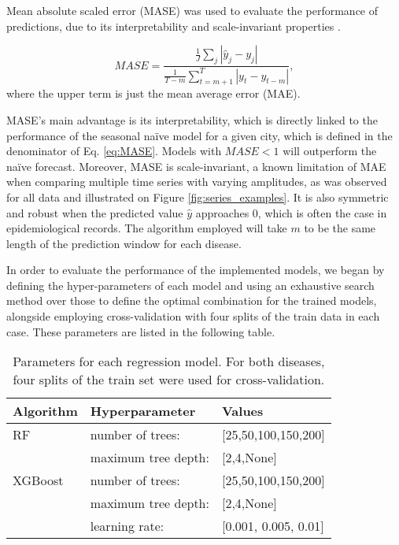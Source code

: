 Mean absolute scaled error (MASE) was used to evaluate the performance of predictions, due to its interpretability and scale-invariant properties \cite{Metricas_paper}.

	\begin{equation}
		\label{eq:MASE}
		MASE =  \frac{ \frac{1}{J} \sum_j |\hat{y}_j - y_j|}{ \frac{1}{T-m} \sum_{t=m+1} ^T |y_t - y_{t-m}|},
	\end{equation}
    \noindent
    where the upper term is just the mean average error (MAE).
    
MASE's main advantage is its interpretability, which is directly linked to the performance of the seasonal naïve model for a given city, which is defined in the denominator of Eq. \ref{eq:MASE}. Models with $MASE < 1$ will outperform the naïve forecast. Moreover, MASE is scale-invariant, a known limitation of MAE when comparing multiple time series with varying amplitudes, as was observed for all data and illustrated on Figure \ref{fig:series_examples}. It is also symmetric and robust when the predicted value $\hat{y}$ approaches 0, which is often the case in epidemiological records. The algorithm employed will take $m$ to be the same length of the prediction window for each disease.


In order to evaluate the performance of the implemented models, we began by defining the hyper-parameters of each model and using an exhaustive search method over those to define the optimal combination for the trained models, alongside employing cross-validation with four splits of the train data in each case. These parameters are listed in the following table.

\begin{table}[h]
	\caption{\label{tab:table2}		Parameters for each regression model. For both diseases, four splits of the train set were used for cross-validation.
	}
	\centering
	\begin{tabular}{lll}
		\textrm{Algorithm}&
		\textrm{Hyperparameter}&
		\textrm{Values}\\
		\hline
		RF & number of trees:    & [25,50,100,150,200] \rule{0pt}{2.6ex}\\
		& maximum tree depth: & [2,4,None] \\
		\hline
		XGBoost & number of trees:    & [25,50,100,150,200] \rule{0pt}{2.6ex}\\
		& maximum tree depth: & [2,4,None] \\
		& learning rate:      & [0.001, 0.005, 0.01]\\
	\end{tabular}
\end{table}

